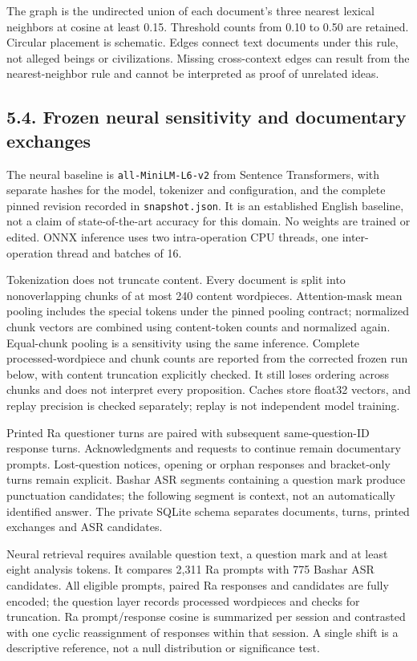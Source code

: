 \documentclass[
  11pt,
]{article}
\begin{document}
The graph is the undirected union of each document's three nearest
lexical neighbors at cosine at least 0.15. Threshold counts from 0.10 to
0.50 are retained. Circular placement is schematic. Edges connect text
documents under this rule, not alleged beings or civilizations. Missing
cross-context edges can result from the nearest-neighbor rule and cannot
be interpreted as proof of unrelated ideas.

\FloatBarrier

\subsection{5.4. Frozen neural sensitivity and documentary
exchanges}\label{frozen-neural-sensitivity-and-documentary-exchanges}

The neural baseline is \texttt{all-MiniLM-L6-v2} from Sentence
Transformers, with separate hashes for the model, tokenizer and
configuration, and the complete pinned revision recorded in
\texttt{snapshot.json}. It is an established English baseline, not a
claim of state-of-the-art accuracy for this domain. No weights are
trained or edited. ONNX inference uses two intra-operation CPU threads,
one inter-operation thread and batches of 16.

Tokenization does not truncate content. Every document is split into
nonoverlapping chunks of at most 240 content wordpieces. Attention-mask
mean pooling includes the special tokens under the pinned pooling
contract; normalized chunk vectors are combined using content-token
counts and normalized again. Equal-chunk pooling is a sensitivity using
the same inference. Complete processed-wordpiece and chunk counts are
reported from the corrected frozen run below, with content truncation
explicitly checked. It still loses ordering across chunks and does not
interpret every proposition. Caches store float32 vectors, and replay
precision is checked separately; replay is not independent model
training.

Printed Ra questioner turns are paired with subsequent same-question-ID
response turns. Acknowledgments and requests to continue remain
documentary prompts. Lost-question notices, opening or orphan responses
and bracket-only turns remain explicit. Bashar ASR segments containing a
question mark produce punctuation candidates; the following segment is
context, not an automatically identified answer. The private SQLite
schema separates documents, turns, printed exchanges and ASR candidates.

Neural retrieval requires available question text, a question mark and
at least eight analysis tokens. It compares 2,311 Ra prompts with 775
Bashar ASR candidates. All eligible prompts, paired Ra responses and
candidates are fully encoded; the question layer records processed
wordpieces and checks for truncation. Ra prompt/response cosine is
summarized per session and contrasted with one cyclic reassignment of
responses within that session. A single shift is a descriptive
reference, not a null distribution or significance test.
\end{document}
